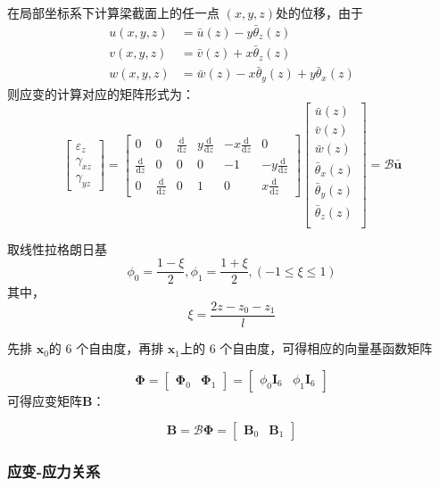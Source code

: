 \documentclass{article}
\begin{document}
在局部坐标系下计算梁截面上的任一点 $(x,y,z)$处的位移，由于
\begin{align*}
u(x, y, z) &= \bar{u}(z)-y\bar{\theta}_z(z)\\
v(x,y,z) &= \bar{v}(z)+x\bar{\theta}_z(z)\\
w(x, y, z) &= \bar{w}(z)-x\bar{\theta}_y(z) + y\bar{\theta}_x(z)
\end{align*}
则应变的计算对应的矩阵形式为：
$$\begin{bmatrix}
\varepsilon_z \\
\gamma_{xz} \\
\gamma_{yz}
\end{bmatrix} = 
\begin{bmatrix}
0 & 0 & 
\frac{\mathrm{d}}{\mathrm{d}z} &
y\frac{\mathrm{d}}{\mathrm{d}z} &
-x\frac{\mathrm{d}}{\mathrm{d}z}&
0\\
\frac{\mathrm{d}}{\mathrm{d}z} &
0 & 0 & 0 & -1 &
-y\frac{\mathrm{d}}{\mathrm{d}z}\\
0&\frac{\mathrm{d}}{\mathrm{d}z} &
0 &  1 & 0 &
x\frac{\mathrm{d}}{\mathrm{d}z}
\end{bmatrix}
\begin{bmatrix}
\bar{u}(z) \\
\bar{v}(z) \\
\bar{w}(z) \\
\bar{\theta}_x(z) \\
\bar{\theta}_y(z) \\
\bar{\theta}_z(z) \\
\end{bmatrix} = 
\mathcal{B}\bar{\bm{u}}$$

取线性拉格朗日基
$$\phi_0=\frac{1-\xi}{2},\phi_1=\frac{1+\xi}{2},(-1\leq\xi\leq1)$$
其中，$$\xi=\frac{2z-z_0-z_1}{l}$$

先排 $\bm{x}_0$的 6 个自由度，再排 $\bm{x}_1$上的 6 个自由度，可得相应的向量基函数矩阵

$$\bm{\Phi} = 
\begin{bmatrix}
\bm{\Phi}_0 & \bm{\Phi}_1
\end{bmatrix} 
= 
\begin{bmatrix}
\phi_0\bm{I}_6 & \phi_1\bm{I}_6
\end{bmatrix} 
$$
可得应变矩阵$\bm{B}$：

$$\bm{B} = \mathcal{B}\bm{\Phi} =
\begin{bmatrix}
\bm{B}_0 & \bm{B}_1
\end{bmatrix}$$

\subsubsection{应变-应力关系}
\end{document}
